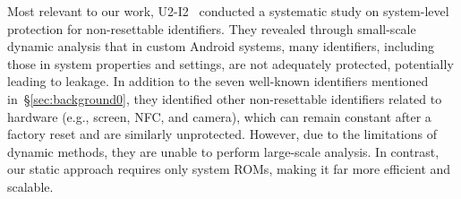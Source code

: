 Most relevant to our work, U2-I2~\cite{meng2023post} conducted a systematic study on system-level protection for non-resettable identifiers.
They revealed through small-scale dynamic analysis that in custom Android systems, many identifiers, including those in system properties and settings, are not adequately protected, potentially leading to leakage.
In addition to the seven well-known identifiers mentioned in~\S\ref{sec:background0}, they identified other non-resettable identifiers related to hardware (e.g., screen, NFC, and camera), which can remain constant after a factory reset and are similarly unprotected.
However, due to the limitations of dynamic methods, they are unable to perform large-scale analysis.
In contrast, our static approach requires only system ROMs, making it far more efficient and scalable. 
